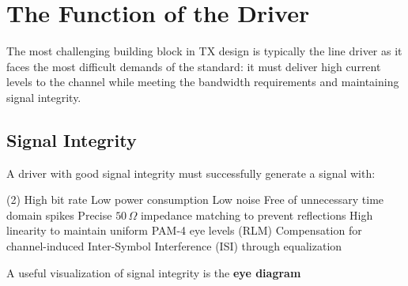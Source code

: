 \begin{table}[htbp]
    \centering
    \caption{Comparative Analysis of Multiplexer Topologies for High-Speed SerDes}
    \label{tab:topology_comparison}
    \renewcommand{\arraystretch}{1.3} %
    
\end{table}




\newpage
\section{The Function of the Driver} \label{sec:driver_function}
The most challenging building block in TX design is typically the line driver as it faces the most difficult demands of the standard: it must deliver high current levels to the channel while meeting the bandwidth requirements and maintaining signal integrity.

\subsection{Signal Integrity} \label{subsec:signal_integrity}
A driver with good signal integrity must successfully generate a signal with:

\begin{tasks}[label=$\bullet$, column-sep=10pt](2) %
    \task High bit rate
    \task Low power consumption
    \task Low noise
    \task Free of unnecessary time domain spikes
    \task Precise $50\,\Omega$ impedance matching to prevent reflections
    \task High linearity to maintain uniform PAM-4 eye levels (RLM)
    \task Compensation for channel-induced Inter-Symbol Interference (ISI) through equalization
\end{tasks}
A useful visualization of signal integrity is the \textbf{eye diagram}
